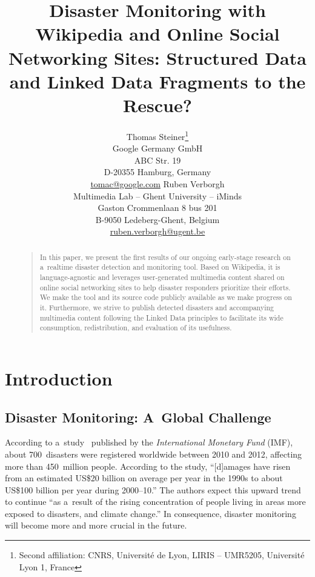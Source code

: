 \documentclass[letterpaper]{article}
\begin{document}
\title{Disaster Monitoring with Wikipedia and Online Social Networking Sites: Structured Data and Linked Data Fragments to the Rescue?}
\author{Thomas Steiner\thanks{Second affiliation: CNRS, Université de Lyon, LIRIS -- UMR5205, Université Lyon 1, France}\\
Google Germany GmbH\\
ABC Str. 19\\
D-20355 Hamburg, Germany\\
\url{tomac@google.com}
\And
Ruben Verborgh\\
Multimedia Lab -- Ghent University -- iMinds\\
Gaston Crommenlaan 8 bus 201\\
B-9050 Ledeberg-Ghent, Belgium\\
\url{ruben.verborgh@ugent.be}
}
\maketitle
\begin{abstract}
\begin{quote}
In this paper, we present the first results of
our ongoing early-stage research
on a~realtime disaster detection and monitoring tool.
Based on Wikipedia, it is language-agnostic
and leverages user-generated multimedia content
shared on online social networking sites
to help disaster responders prioritize their efforts.
We make the tool and its source code publicly available
as we make progress on it.
Furthermore, we strive to publish detected disasters
and accompanying multimedia content
following the Linked Data principles
to facilitate its wide consumption,
redistribution, and evaluation of its usefulness.

\end{quote}
\end{abstract}

\section{Introduction}

\subsection{Disaster Monitoring: A~Global Challenge}
\label{sec:natural-disaster-detection}

According to a~study~\cite{laframboise2012naturaldisasters}
published by the \emph{International Monetary Fund} (IMF),
about 700~disasters were registered worldwide between 2010 and 2012,
affecting more than 450~million people.
According to the study, ``[d]amages have risen
from an estimated US\$20 billion on average per year
in the 1990s to about US\$100 billion per year during 2000--10.''
The authors expect this upward trend to continue
``as a~result of the rising concentration of people
living in areas more exposed to disasters,
and climate change.''
In consequence, disaster monitoring will
become more and more crucial in the future.
\end{document}
